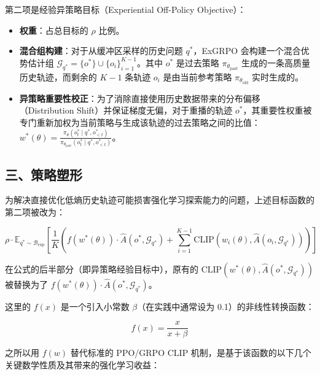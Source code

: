 第二项是经验异策略目标（Experiential Off-Policy Objective）：

\begin{itemize}
\tightlist
\item
  \textbf{权重}：占总目标的 \(\rho\) 比例。
\item
  \textbf{混合组构建}：对于从缓冲区采样的历史问题 \(q^*\)，ExGRPO 会构建一个混合优势估计组 \(\mathcal{G}_{q^*}=\{o^*\}\cup\{o_i\}_{i=1}^{K-1}\)。其中 \(o^*\) 是过去策略 \(\pi_{\theta_{\mathrm{past}}}\) 生成的一条高质量历史轨迹，而剩余的 \(K-1\) 条轨迹 \(o_i\) 是由当前参考策略 \(\pi_{\theta_{\mathrm{old}}}\) 实时生成的。
\item
  \textbf{异策略重要性校正}：为了消除直接使用历史数据带来的分布偏移（Distribution Shift）并保证梯度无偏，对于重播的轨迹 \(o^*\)，其重要性权重被专门重新加权为当前策略与生成该轨迹的过去策略之间的比值：\(w^*(\theta)=\frac{\pi_\theta(o_t^{*}\mid q^*,o_{<t}^{*})}{\pi_{\theta_{\mathrm{past}}}(o_t^{*}\mid q^*,o_{<t}^{*})}\)。
\end{itemize}

\hypertarget{ux4e09ux7b56ux7565ux5851ux5f62}{%
\subsection{三、策略塑形}\label{ux4e09ux7b56ux7565ux5851ux5f62}}

为解决直接优化低熵历史轨迹可能损害强化学习探索能力的问题，上述目标函数的第二项被改为：

\[
\rho\cdot
\mathbb{E}_{q^*\sim\mathcal{B}_{\mathrm{exp}}}
\left[
\frac{1}{K}
\left(
f\left(w^*(\theta)\right)\cdot\hat{A}(o^*,\mathcal{G}_{q^*})
+\sum_{i=1}^{K-1}
\mathrm{CLIP}\left(w_i(\theta),\hat{A}(o_i,\mathcal{G}_{q^*})\right)
\right)
\right]
\]

在公式的后半部分（即异策略经验目标中），原有的 \(\mathrm{CLIP}\left(w^*(\theta),\hat{A}(o^*,\mathcal{G}_{q^*})\right)\) 被替换为了 \(f\left(w^*(\theta)\right)\cdot\hat{A}(o^*,\mathcal{G}_{q^*})\)。

这里的 \(f(x)\) 是一个引入小常数 \(\beta\)（在实践中通常设为 0.1）的非线性转换函数：

\[
f(x)=\frac{x}{x+\beta}
\]

之所以用 \(f(w)\) 替代标准的 PPO/GRPO \(\mathrm{CLIP}\) 机制，是基于该函数的以下几个关键数学性质及其带来的强化学习收益：

